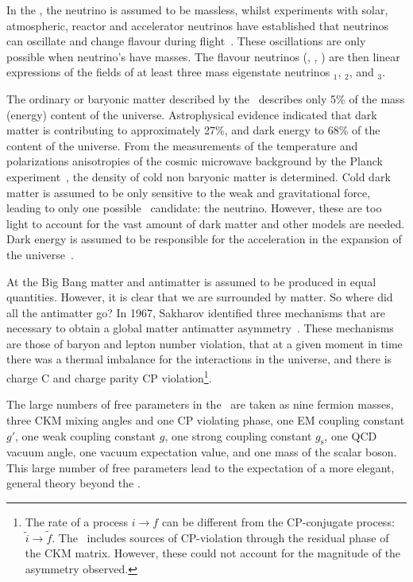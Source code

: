 In the \SM, the neutrino is assumed to be massless, whilst experiments with solar, atmospheric, reactor and accelerator neutrinos have established that neutrinos can oscillate and change flavour during flight~\cite{Fukuda:1998mi,PhysRevLett.108.131801}. These oscillations are only possible when neutrino's have masses. The flavour neutrinos (\Pnue, \Pnum, \Pnut) are then linear expressions of the fields of at least three mass eigenstate neutrinos \Pnu$_1$, \Pnu$_2$, and \Pnu$_3$. 

The ordinary or baryonic matter described by the \SM\ describes only 5\% of the mass (energy) content of the universe. Astrophysical evidence indicated that dark matter is contributing to approximately 27\%, and dark energy to 68\% of the content of the universe. From the measurements of the temperature and polarizations anisotropies of the cosmic microwave background by the Planck experiment~\cite{Ade:2015xua}, the density of cold non baryonic matter is determined. Cold dark matter is assumed to be only sensitive to the weak and gravitational force, leading to only one possible \SM\ candidate: the neutrino. However, these are too light to account for the vast amount of dark matter and other models are needed. Dark energy is assumed to be responsible for the acceleration in the expansion of the universe~\cite{Peebles:2002gy}. 

At the Big Bang matter and antimatter is assumed to be produced in equal quantities. However, it  is clear that we are surrounded by matter. So where did all the antimatter go? In 1967, Sakharov identified three mechanisms that are necessary to obtain a global matter antimatter asymmetry~\cite{Sakharov}. These mechanisms are those of baryon and lepton number violation, that at a given moment in time there was a thermal imbalance for the interactions in the universe, and there is charge C and charge parity CP violation\footnote{The rate of a process $i\rightarrow f$ can be different from the CP-conjugate process: $\tilde i \rightarrow \tilde f$. The \SM\ includes sources of CP-violation through the residual phase of the CKM matrix. However, these could not account for the magnitude of the asymmetry observed.}.

The large numbers of free parameters in the \SM\ are taken as nine fermion masses, three CKM mixing angles and one CP violating phase, one EM coupling constant $g'$, one weak coupling constant $g$, one strong coupling constant $g_{\mathrm{s}}$, one QCD vacuum angle, one vacuum expectation value, and one mass of the scalar boson. This large number of free parameters lead to the expectation of a more elegant, general theory beyond the \SM. 

